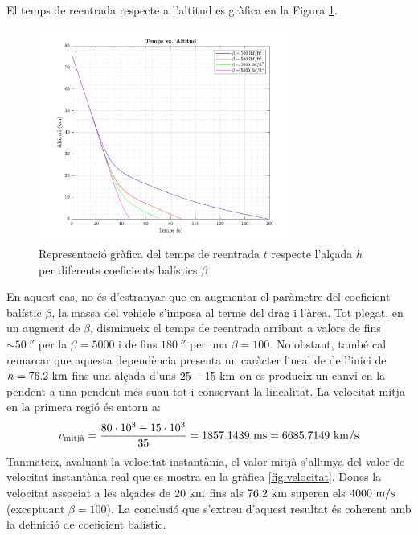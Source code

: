 El temps de reentrada respecte a l'altitud es gràfica en la Figura \ref{fig:temps}.
\begin{figure}[ht]
    \centering
    \includegraphics[width=0.75\textwidth]{imagenes/01_ballistic_graficas/temps.pdf}
    \caption{Representació gràfica del temps de reentrada $t$ respecte l'alçada $h$ per diferents coeficients balístics $\beta$}
    \label{fig:temps}
\end{figure}
En aquest cas, no és d'estranyar que en augmentar el paràmetre del coeficient balístic $\beta$, la massa del vehicle s'imposa al terme del drag i l'àrea. Tot plegat, en un augment de $\beta$, disminueix el temps de reentrada arribant a valors de fins $\sim 50 \ \second$ per la $\beta = 5000$ i de fins $180 \ \second$ per una $\beta = 100$. No obstant, també cal remarcar que aquesta dependència presenta un caràcter lineal de de l'inici de $h = 76.2 \ \kilo\meter$ fins una alçada d'uns $25 - 15 \ \kilo\meter$ on es produeix un canvi en la pendent a una pendent més suau tot i conservant la linealitat.
La velocitat mitja en la primera regió és entorn a:
\begin{equation*}
    v_{\text{mitjà}} = \frac{80\cdot10^3 - 15\cdot10^3}{35} = 1857.1439 \ \meter\second = 6685.7149 \ \kilo\meter/\second
\end{equation*}
Tanmateix, avaluant la velocitat instantània, el valor mitjà s'allunya del valor de velocitat instantània real que es mostra en la gràfica \ref{fig:velocitat}. Doncs la velocitat associat a les alçades de $20 \ \kilo\meter$ fins als $76.2 \ \kilo\meter$ superen els $4000 \ \meter/\second$ (exceptuant $\beta=100$). La conclusió que s'extreu d'aquest resultat és coherent amb la definició de coeficient balístic.

\newpage
